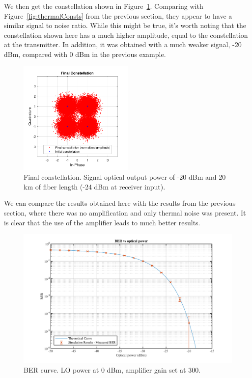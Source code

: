 We then get the constellation shown in 
Figure~\ref{fig:eNoise_varAmp_constFinal}. Comparing with 
Figure~\ref{fig:thermalConsts} from the previous section, they appear to have a 
similar signal to noise ratio. While this might be true, it's worth noting that 
the constellation shown here has a much higher amplitude, equal to the 
constellation at the transmitter. In addition, it was obtained with a much 
weaker signal, -20 dBm, compared with 0 dBm in the previous example.

\begin{figure}[H]
	\centering
	\includegraphics[width=0.5\textwidth]
	{sdf/m_qam_system/figures/simulations/03_eNoise/constFinal.pdf}
	\caption{Final constellation. Signal optical output power of -20 dBm and 20 
	km of fiber length (-24 dBm at receiver 
	input).}\label{fig:eNoise_varAmp_constFinal}
\end{figure}

We can compare the results obtained here with the results from the previous 
section, where there was no amplification and only thermal noise was present. 
It is clear that the use of the amplifier leads to much better results.

	\begin{figure}[H]
	\centering
	\includegraphics[width=1\textwidth]
	{sdf/m_qam_system/figures/simulations/03_eNoise/berVsOpticalPower.pdf}
	\caption{BER curve. LO power at 0 dBm, amplifier gain set at 
	300.}\label{fig:eNoise_varAmp_berVsOpticalPower}
\end{figure}


